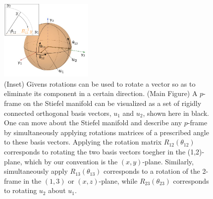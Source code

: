 \documentclass[ba]{imsart}
\numberwithin{equation}{section}
\theoremstyle{plain}
\begin{document}


\begin{figure}[h]
\centering
\vspace{.1in}
\includegraphics[width=0.4\textwidth]{figures/stiefel_geom_new.png}
\vspace{.05in}
\caption{(Inset) Givens rotations can be used to rotate a vector so as to eliminate its component in a certain direction. (Main Figure) A $p$-frame on the Stiefel manifold can be visualized as a set of rigidly connected orthogonal basis vectors, $u_1$ and $u_2$, shown here in black. One can move about the Stiefel manifold and describe any $p$-frame by simultaneously applying rotations matrices of a prescribed angle to these basis vectors. Applying the rotation matrix $R_{12}(\theta_{12})$ corresponds to rotating the two basis vectors toegher in the (1,2)-plane, which by our convention is the $(x,y)$-plane. Similarly, simultaneously apply $R_{13}(\theta_{13})$ corresponds to a rotation of the 2-frame in the $(1,3)$ or $(x,z)$-plane, while $R_{23}(\theta_{23})$ corresponds to rotating $u_2$ about $u_1$.}
\label{fig:StiefelGeom}
\end{figure}
\end{document}
